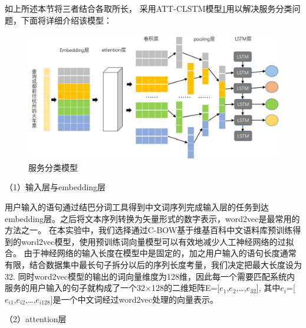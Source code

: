 如上所述本节将三者结合各取所长， 采用ATT-CLSTM模型\ref{fig:cnn-lstm}用以解决服务分类问题，下面将详细介绍该模型：

\begin{figure}[htbp]
    \centering
    \includegraphics[scale=0.5]{./images/cnn-lstm.jpg}
    \caption{服务分类模型}
    \label{fig:cnn-lstm}
  \end{figure}
  （1）输入层与embedding层

  用户输入的语句通过结巴分词工具得到中文词序列完成输入层的任务到达embedding层。之后将文本序列转换为矢量形式的数字表示，word2vec是最常用的方法之一。
  在本实验中，我们选择通过C-BOW基于维基百科中文语料库预训练得到的word2vec模型，使用预训练词向量模型可以有效地减少人工神经网络的过拟合。
  由于神经网络的输入长度在模型中是固定的，加之用户输入的语句长度通常有限，结合数据集中最长句子拆分以后的序列长度考量，我们决定把最大长度设为32.
  同时word2vec模型的输出的词向量维度为128维，因此每一个需要匹配系统内服务的用户输入的句子就构成了一个32×128的二维矩阵E=[$e_{1}$,$e_{2}$,\dots,$e_{32}$],
  其中$e_{i}$=[$e_{i1}$,$e_{i2}$,\dots,$e_{i128}$]是一个中文词经过word2vec处理的向量表示。

  （2）attention层

